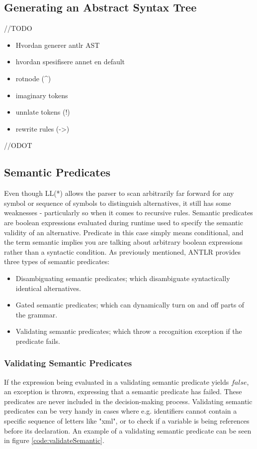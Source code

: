 \subsection{Generating an Abstract Syntax Tree}
//TODO
\begin{itemize}
\item Hvordan generer antlr AST 
\item hvordan spesifisere annet en default 
\item rotnode (\^{})
\item imaginary tokens
\item unnlate tokens (!)
\item rewrite rules (->)
\end{itemize}
//ODOT

\subsection{Semantic Predicates}
Even though LL(*) allows the parser to scan arbitrarily far forward for any symbol or sequence of symbols to distinguish alternatives, it still has some weaknesses - particularly so when it comes to recursive rules. Semantic predicates are boolean expressions evaluated during runtime used to specify the semantic validity of an alternative. Predicate in this case simply means conditional, and the term semantic implies you are talking about arbitrary boolean expressions rather than a syntactic condition.  As previously mentioned, ANTLR provides three types of semantic predicates:
\begin{itemize}
\item Disambiguating semantic predicates; which disambiguate syntactically identical alternatives.
\item Gated semantic predicates; which can dynamically turn on and off parts of the grammar.
\item Validating semantic predicates; which throw a recognition exception if the predicate fails.
\end{itemize}

\subsubsection{Validating Semantic Predicates}
If the expression being evaluated in a validating semantic predicate yields $false$, an exception is thrown, expressing that a semantic predicate has failed. These predicates are never included in the decision-making process. Validating semantic predicates can be very handy in cases where e.g. identifiers cannot contain a specific sequence of letters like "xml", or to check if a variable is being references before its declaration. An example of a validating semantic predicate can be seen in figure \ref{code:validateSemantic}.

